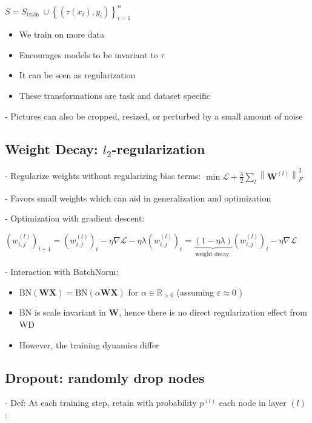 $
S=S_{\text {train }} \cup\left\{\left(\tau\left(x_{i}\right), y_{i}\right)\right\}_{i=1}^{n}
$

\begin{itemize}
  \item We train on more data

  \item Encourages models to be invariant to $\tau$

  \item It can be seen as regularization

  \item These transformations are task and dataset specific

\end{itemize}

- Pictures can also be cropped, resized, or perturbed by a small amount of noise



\subsection*{Weight Decay: $l_{2}$-regularization}

- Regularize weights without regularizing bias terms:
$
\min \mathscr{L}+\frac{\lambda}{2} \sum_{l}\left\|\mathbf{W}^{(l)}\right\|_{F}^{2}
$

- Favors small weights which can aid in generalization and optimization

- Optimization with gradient descent:

$
\left(w_{i, j}^{(l)}\right)_{t+1}=\left(w_{i, j}^{(l)}\right)_{t}-\eta \nabla \mathscr{L}-\eta \lambda\left(w_{i, j}^{(l)}\right)_{t}=\underbrace{(1-\eta \lambda)}_{\text {weight decay }}\left(w_{i, j}^{(l)}\right)_{t}-\eta \nabla \mathscr{L}
$

- Interaction with BatchNorm:

\begin{itemize}
  \item $\mathrm{BN}(\mathbf{W X})=\mathrm{BN}(\alpha \mathbf{W X})$ for $\alpha \in \mathbb{R}_{>0}$ (assuming $\varepsilon \approx 0$ )
  \item $\mathrm{BN}$ is scale invariant in $\mathbf{W}$, hence there is no direct regularization effect from WD
  \item However, the training dynamics differ 
\end{itemize}


\subsection*{Dropout: randomly drop nodes}
- Def: At each training step, retain with probability $p^{(l)}$ each node in layer $(l)$ :

